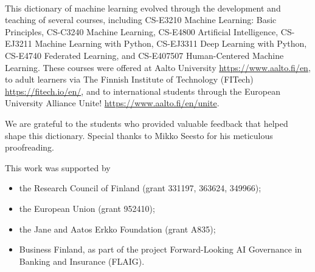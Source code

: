 \documentclass[journal,12pt,onecolumn]{article}
\newif\iffastdraft
\begin{document}
\newpage 
{}\

\noindent This dictionary of machine learning evolved through the development 
and teaching of several courses, including CS-E3210 Machine Learning: Basic Principles, 
CS-C3240 Machine Learning, CS-E4800 Artificial Intelligence, CS-EJ3211 Machine Learning with Python, 
CS-EJ3311 Deep Learning with Python, CS-E4740 Federated Learning, and 
CS-E407507 Human-Centered Machine Learning. These courses were offered at 
Aalto University \url{https://www.aalto.fi/en}, to adult learners via 
The Finnish Institute of Technology (FITech) \url{https://fitech.io/en/}, and to international 
students through the European University Alliance Unite! \url{https://www.aalto.fi/en/unite}.

\noindent We are grateful to the students who provided valuable feedback that helped shape this dictionary. 
Special thanks to Mikko Seesto for his meticulous proofreading.

\noindent This work was supported by
\begin{itemize} 
	\item the Research Council of Finland (grant 331197, 363624, 349966);
	\item the European Union (grant 952410);
	\item the Jane and Aatos Erkko Foundation (grant A835); 
	\item Business Finland, as part of the project Forward-Looking AI Governance in Banking and Insurance (FLAIG).
\end{itemize} 

\newpage
\tableofcontents

\newpage 


\newpage

\glsaddallunused


\printglossary[type=math,title={Tools}, nonumberlist]

\newpage
\printglossary[title={Machine Learning Concepts}, nonumberlist]

\printglossary[type=systems, title={Machine Learning Systems}, nonumberlist]



\iffastdraft
\else
\newpage
{}
\pagestyle{empty}
\printindex
\fi


\newpage


\end{document}
